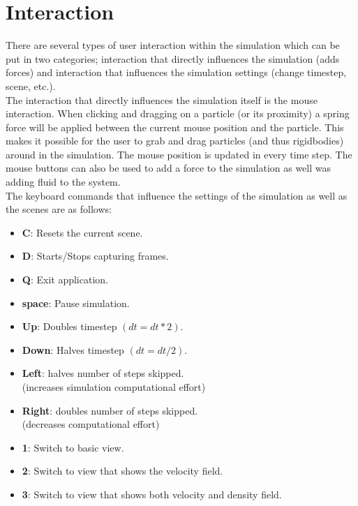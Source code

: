 \chapter{Interaction}
There are several types of user interaction within the simulation which can be put in two categories; interaction that directly influences the simulation (adds forces) and interaction that influences the simulation settings (change timestep, scene, etc.). \\

\smallskip
The interaction that directly influences the simulation itself is the mouse interaction. When clicking and dragging on a particle (or its proximity) a spring force will be applied between the current mouse position and the particle. This makes it possible for the user to grab and drag particles (and thus rigidbodies) around in the simulation. The mouse position is updated in every time step. The mouse buttons can also be used to add a force to the simulation as well was adding fluid to the system. \\

\smallskip
The keyboard commands that influence the settings of the simulation as well as the scenes are as follows: \\
\begin{itemize}
  \item \textbf{C}: Resets the current scene.
  \item \textbf{D}: Starts/Stops capturing frames.
  \item \textbf{Q}: Exit application.
  \item \textbf{space}: Pause simulation.
  \item \textbf{Up}: Doubles timestep $(dt=dt*2)$.
  \item \textbf{Down}: Halves timestep $(dt = dt/2)$.
  \item \textbf{Left}: halves number of steps skipped. \\
  (increases simulation computational effort)
  \item \textbf{Right}: doubles number of steps skipped. \\
  (decreases computational effort)
  \item \textbf{1}: Switch to basic view.
  \item \textbf{2}: Switch to view that shows the velocity field.
  \item \textbf{3}: Switch to view that shows both velocity and density field.
\end{itemize}


